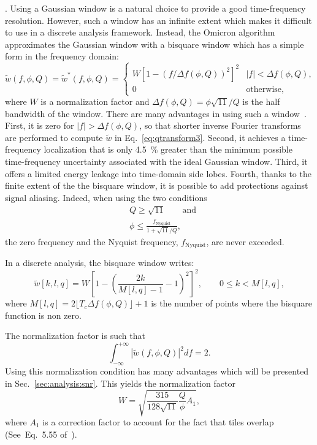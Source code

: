 . Using a Gaussian window is a natural choice to provide a good time-frequency resolution. However, such a window has an infinite extent which makes it difficult to use in a discrete analysis framework. Instead, the Omicron algorithm approximates the Gaussian window with a bisquare window which has a simple form in the frequency domain:
\begin{equation}
  \tilde{w}(f,\phi,Q) = \tilde{w}^*(f,\phi,Q) =
  \begin{cases}
    W\left[1 - \left(f/\Delta f(\phi,Q)\right)^2 \right]^2 & |f| < \Delta f(\phi,Q), \\
    0 & \textrm{otherwise},
  \end{cases}
  \label{eq:bisquare}
\end{equation}
where $W$ is a normalization factor and $\Delta f(\phi,Q)=\phi\sqrt{11}/Q$ is the half bandwidth of the window. There are many advantages in using such a window~\cite{Chatterji:2004}. First, it is zero for $|f| > \Delta f(\phi,Q)$, so that shorter inverse Fourier transforms are performed to compute $\tilde{w}$ in Eq.~\ref{eq:qtransform3}. Second, it achieves a time-frequency localization that is only 4.5~\% greater than the minimum possible time-frequency uncertainty associated with the ideal Gaussian window. Third, it offers a limited energy leakage into time-domain side lobes. Fourth, thanks to the finite extent of the the bisquare window, it is possible to add protections against signal aliasing. Indeed, when using the two conditions
\begin{align}
  &Q\ge\sqrt{11} \qquad \text{and}\label{eq:antialias1} \\
  &\phi \le \frac{f_{\text{Nyquist}}}{1+\sqrt{11}/Q}, \label{eq:antialias2}
\end{align}
the zero frequency and the Nyquist frequency, $f_{\text{Nyquist}}$, are never exceeded.

In a discrete analysis, the bisquare window writes:
\begin{equation}
  \tilde{w}[k,l,q] = W \left[1 - \left(\frac{2k}{M[l,q]-1}-1\right)^2 \right]^2, \qquad 0\le k < M[l,q],
  \label{eq:dbisquare}
\end{equation}
where $M[l,q] = 2\lfloor{T_c\Delta f(\phi,Q)\rfloor} +1$ is the number of points where the bisquare function is non zero.

The normalization factor is such that
\begin{equation}
  \int_{-\infty}^{+\infty}{|\tilde{w}(f,\phi,Q)|^2df} = 2.
  \label{eq:winnorm}
\end{equation}
Using this normalization condition has many advantages which will be presented in Sec.~\ref{sec:analysis:snr}. This yields the normalization factor
\begin{equation}
  W = \sqrt{\frac{315}{128\sqrt{11}} \frac{Q}{\phi}A_1},
  \label{eq:W}
\end{equation}
where $A_1$ is a correction factor to account for the fact that tiles overlap (See~Eq.~5.55 of~\cite{Chatterji:2004}).

